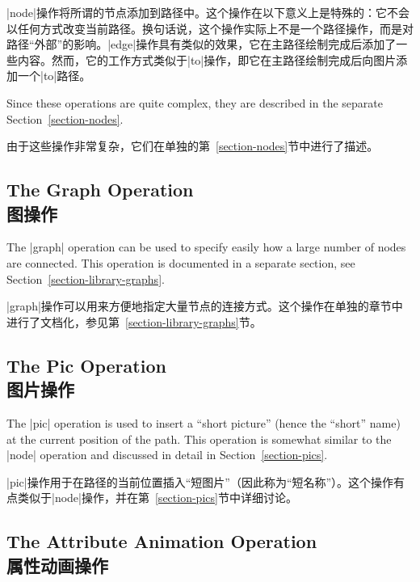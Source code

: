 |node|操作将所谓的节点添加到路径中。这个操作在以下意义上是特殊的：它不会以任何方式改变当前路径。换句话说，这个操作实际上不是一个路径操作，而是对路径“外部”的影响。|edge|操作具有类似的效果，它在主路径绘制完成后添加了一些内容。然而，它的工作方式类似于|to|操作，即它在主路径绘制完成后向图片添加一个|to|路径。

Since these operations are quite complex, they are described in the separate
Section~\ref{section-nodes}.

由于这些操作非常复杂，它们在单独的第~\ref{section-nodes}节中进行了描述。


\subsection{The Graph Operation\\图操作}

The |graph| operation can be used to specify easily how a large number of nodes
are connected. This operation is documented in a separate section, see
Section~\ref{section-library-graphs}.

|graph|操作可以用来方便地指定大量节点的连接方式。这个操作在单独的章节中进行了文档化，参见第~\ref{section-library-graphs}节。


\subsection{The Pic Operation\\图片操作}

The |pic| operation is used to insert a ``short picture'' (hence the ``short''
name) at the current position of the path. This operation is somewhat similar
to the |node| operation and discussed in detail in Section~\ref{section-pics}.

|pic|操作用于在路径的当前位置插入“短图片”（因此称为“短名称”）。这个操作有点类似于|node|操作，并在第~\ref{section-pics}节中详细讨论。


\subsection{The Attribute Animation Operation\\属性动画操作}

